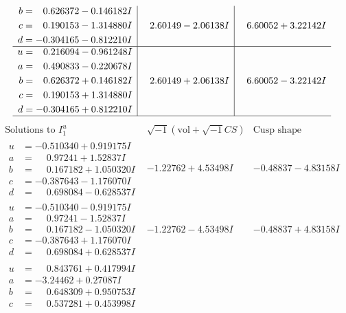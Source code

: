 \documentclass[1p]{elsarticle_modified}
\theoremstyle{definition}
\newcommand{\I}{\sqrt{-1}}
\begin{document}
$$\begin{array}{c|c|c}
\begin{aligned}
b &= \phantom{-}0.626372 - 0.146182 I \\
c &= \phantom{-}0.190153 - 1.314880 I \\
d &= -0.304165 - 0.812210 I\end{aligned}
 & \phantom{-}2.60149 - 2.06138 I & \phantom{-}6.60052 + 3.22142 I \\ \hline\begin{aligned}
u &= \phantom{-}0.216094 - 0.961248 I \\
a &= \phantom{-}0.490833 - 0.220678 I \\
b &= \phantom{-}0.626372 + 0.146182 I \\
c &= \phantom{-}0.190153 + 1.314880 I \\
d &= -0.304165 + 0.812210 I\end{aligned}
 & \phantom{-}2.60149 + 2.06138 I & \phantom{-}6.60052 - 3.22142 I\\
 \hline 
 \end{array}$$\newpage$$\begin{array}{c|c|c}  
\text{Solutions to }I^u_{1}& \I (\text{vol} + \sqrt{-1}CS) & \text{Cusp shape}\\
 \hline 
\begin{aligned}
u &= -0.510340 + 0.919175 I \\
a &= \phantom{-}0.97241 + 1.52837 I \\
b &= \phantom{-}0.167182 + 1.050320 I \\
c &= -0.387643 - 1.176070 I \\
d &= \phantom{-}0.698084 - 0.628537 I\end{aligned}
 & -1.22762 + 4.53498 I & -0.48837 - 4.83158 I \\ \hline\begin{aligned}
u &= -0.510340 - 0.919175 I \\
a &= \phantom{-}0.97241 - 1.52837 I \\
b &= \phantom{-}0.167182 - 1.050320 I \\
c &= -0.387643 + 1.176070 I \\
d &= \phantom{-}0.698084 + 0.628537 I\end{aligned}
 & -1.22762 - 4.53498 I & -0.48837 + 4.83158 I \\ \hline\begin{aligned}
u &= \phantom{-}0.843761 + 0.417994 I \\
a &= -3.24462 + 0.27087 I \\
b &= \phantom{-}0.648309 + 0.950753 I \\
c &= \phantom{-}0.537281 + 0.453998 I \\

\end{aligned}
\end{array}$$
\end{document}
